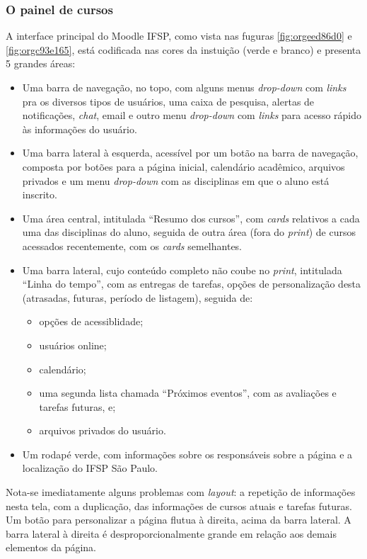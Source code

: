 \documentclass[11pt]{article}
\begin{document}
\subsubsection*{O painel de cursos}
\label{sec:org1b5e27d}
A interface principal do Moodle IFSP, como vista nas fuguras
\ref{fig:orgeed86d0} e \ref{fig:orgc93e165}, está codificada nas cores da instuição (verde e branco)
e presenta 5 grandes áreas:
\begin{itemize}
\item Uma barra de navegação, no topo, com alguns menus \emph{drop-down} com
\emph{links} pra os diversos tipos de usuários, uma caixa de pesquisa,
alertas de notificações, \emph{chat}, email e outro menu \emph{drop-down} com
\emph{links} para acesso rápido às informações do usuário.
\item Uma barra lateral à esquerda, acessível por um botão na barra de
navegação, composta por botões para a página inicial, calendário
acadêmico, arquivos privados e um menu \emph{drop-down} com as
disciplinas em que o aluno está inscrito.
\item Uma área central, intitulada ``Resumo dos cursos'', com \emph{cards}
relativos a cada uma das disciplinas do aluno, seguida de outra área
(fora do \emph{print}) de cursos acessados recentemente, com os \emph{cards} semelhantes.
\item Uma barra lateral, cujo conteúdo completo não coube no \emph{print},
intitulada ``Linha do tempo'', com as entregas de tarefas, opções de
personalização desta (atrasadas, futuras, período de listagem),
seguida de:
\begin{itemize}
\item opções de acessiblidade;
\item usuários online;
\item calendário;
\item uma segunda lista chamada ``Próximos eventos'', com as avaliações
e tarefas futuras, e;
\item arquivos privados do usuário.
\end{itemize}
\item Um rodapé verde, com informações sobre os responsáveis sobre a
página e a localização do IFSP São Paulo.
\end{itemize}

Nota-se imediatamente alguns problemas com \emph{layout}: a repetição de
informações nesta tela, com a duplicação, das informações de
cursos atuais e tarefas futuras. Um botão para personalizar a página
flutua à direita, acima da barra lateral. A barra lateral à direita é
desproporcionalmente grande em relação aos demais elementos da página.
\end{document}

